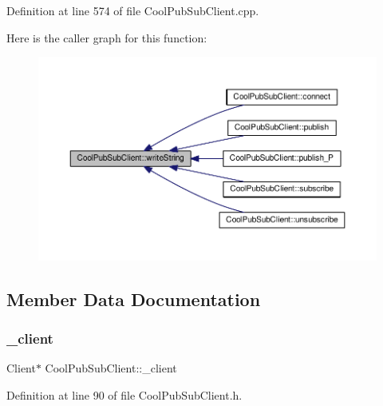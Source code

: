 Definition at line 574 of file Cool\+Pub\+Sub\+Client.\+cpp.

Here is the caller graph for this function\+:
\nopagebreak
\begin{figure}[H]
\begin{center}
\leavevmode
\includegraphics[width=350pt]{class_cool_pub_sub_client_a0e3d7e776d4cf4427f9569b28868905a_icgraph}
\end{center}
\end{figure}


\subsection{Member Data Documentation}
\mbox{\label{class_cool_pub_sub_client_a487a65bafb6e3b8e9ab544b13a8878a0}} 
\subsubsection{\texorpdfstring{\+\_\+client}{\_client}}
{\footnotesize\ttfamily Client$\ast$ Cool\+Pub\+Sub\+Client\+::\+\_\+client\hspace{0.3cm}{\ttfamily [private]}}



Definition at line 90 of file Cool\+Pub\+Sub\+Client.\+h.

\mbox{\label{class_cool_pub_sub_client_aa1953b601206252a30efa5b114eb3e1a}} 
